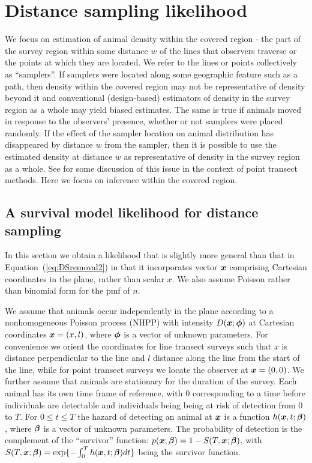 \documentclass[useAMS,usenatbib,referee]{biom}
\begin{document}
\section{Distance sampling likelihood\label{sec:DSlikelihood}}
We focus on estimation of animal density within the covered region - the part of the survey region within some distance $w$ of the lines that observers traverse or the points at which they are located. We refer to the lines or points collectively as ``samplers''. If samplers were located along some geographic feature such as a path, then density within the covered region may not be representative of density beyond it and conventional (design-based) estimators of density in the survey region as a whole may yield biased estimates. The same is true if animals moved in response to the observers' presence, whether or not samplers were placed randomly. If the effect of the sampler location on animal distribution has disappeared by distance $w$ from the sampler, then it is possible to use the estimated density at distance $w$ as representative of density in the survey region as a whole. See \cite{Marques+al:10} for some discussion of this issue in the context of point transect methods. Here we focus on inference within the covered region.

\subsection{A survival model likelihood for distance sampling}
In this section we obtain a likelihood that is slightly more general than that in  Equation~(\ref{eq:DSremoval2}) in that it incorporates vector $\mbox{\boldmath $x$}$ comprising Cartesian coordinates in the plane, rather than scalar $x$. We also assume Poisson rather than binomial form for the pmf of $n$.

We assume that animals occur independently in the plane according to a nonhomogeneous Poisson process (NHPP) with intensity $D({\mbox{\boldmath $x$}};{\mbox{\boldmath $\phi$}})$ at Cartesian coordinates ${\mbox{\boldmath $x$}}=(x,l)$, where ${\mbox{\boldmath $\phi$}}$ is a vector of unknown parameters. For convenience we orient the coordinates for line transect surveys such that $x$ is distance perpendicular to the line and $l$ distance along the line from the start of the line, while for point transect surveys we locate the observer at ${\mbox{\boldmath $x$}}=(0,0)$. We further assume that animals are stationary for the duration of the survey. Each animal has its own time frame of reference, with 0 corresponding to a time before individuals are detectable and individuals being being at risk of detection from 0 to $T$. For $0\leq t \leq T$ the hazard of detecting an animal at ${\mbox{\boldmath $x$}}$ is a function $h({\mbox{\boldmath $x$}},t;{\mbox{\boldmath $\beta$}})$, where ${\mbox{\boldmath $\beta$}}$ is a vector of unknown parameters. The probability of detection is the complement of the ``survivor'' function: $p({\mbox{\boldmath $x$}};{\mbox{\boldmath $\beta$}})=1-S(T,{\mbox{\boldmath $x$}};{\mbox{\boldmath $\beta$}})$, with $S(T,{\mbox{\boldmath $x$}};{\mbox{\boldmath $\beta$}})=\exp\{-\int_0^T h({\mbox{\boldmath $x$}},t;{\mbox{\boldmath $\beta$}})dt\}$ being the survivor function. 
\end{document}
